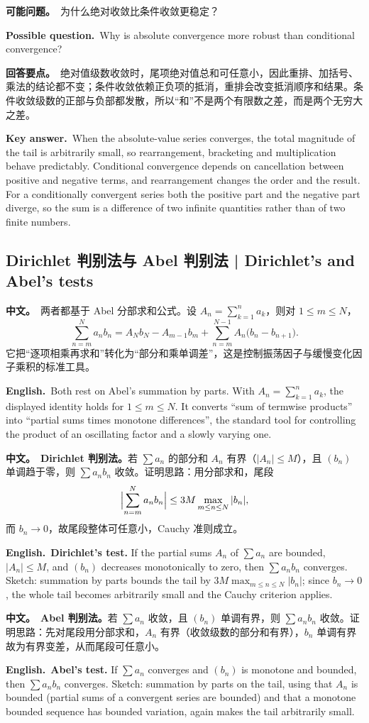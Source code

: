 \documentclass[UTF8,11pt,a4paper]{ctexart}
\newcommand{\BOTH}[2]{\par\noindent\textbf{中文。}\ #1\par\noindent\textbf{English.}\ #2\par}
\newcommand{\ASK}[4]{\begin{samepage}\par\noindent\textbf{可能问题。}\ #1\par\noindent\textbf{Possible question.}\ #2\par\noindent\textbf{回答要点。}\ #3\par\noindent\textbf{Key answer.}\ #4\medskip\end{samepage}}
\begin{document}
\ASK{为什么绝对收敛比条件收敛更稳定？}{Why is absolute convergence more robust than conditional convergence?}{绝对值级数收敛时，尾项绝对值总和可任意小，因此重排、加括号、乘法的结论都不变；条件收敛依赖正负项的抵消，重排会改变抵消顺序和结果。条件收敛级数的正部与负部都发散，所以“和”不是两个有限数之差，而是两个无穷大之差。}{When the absolute-value series converges, the total magnitude of the tail is arbitrarily small, so rearrangement, bracketing and multiplication behave predictably. Conditional convergence depends on cancellation between positive and negative terms, and rearrangement changes the order and the result. For a conditionally convergent series both the positive part and the negative part diverge, so the sum is a difference of two infinite quantities rather than of two finite numbers.}

\subsection{Dirichlet 判别法与 Abel 判别法 | Dirichlet's and Abel's tests}
\BOTH{两者都基于 Abel 分部求和公式。设 $A_n=\sum_{k=1}^{n}a_k$，则对 $1\le m\le N$，
\[
\sum_{n=m}^{N}a_nb_n=A_Nb_N-A_{m-1}b_m+\sum_{n=m}^{N-1}A_n\bigl(b_n-b_{n+1}\bigr).
\]
它把“逐项相乘再求和”转化为“部分和乘单调差”，这是控制振荡因子与缓慢变化因子乘积的标准工具。}{Both rest on Abel's summation by parts. With $A_n=\sum_{k=1}^{n}a_k$, the displayed identity holds for $1\le m\le N$. It converts “sum of termwise products” into “partial sums times monotone differences”, the standard tool for controlling the product of an oscillating factor and a slowly varying one.}
\BOTH{\textbf{Dirichlet 判别法。}若 $\sum a_n$ 的部分和 $A_n$ 有界（$|A_n|\le M$），且 $(b_n)$ 单调趋于零，则 $\sum a_nb_n$ 收敛。证明思路：用分部求和，尾段
\[
\Bigl|\sum_{n=m}^{N}a_nb_n\Bigr|\le 3M\max_{m\le n\le N}|b_n|,
\]
而 $b_n\to0$，故尾段整体可任意小，Cauchy 准则成立。}{\textbf{Dirichlet's test.} If the partial sums $A_n$ of $\sum a_n$ are bounded, $|A_n|\le M$, and $(b_n)$ decreases monotonically to zero, then $\sum a_nb_n$ converges. Sketch: summation by parts bounds the tail by $3M\max_{m\le n\le N}|b_n|$; since $b_n\to0$, the whole tail becomes arbitrarily small and the Cauchy criterion applies.}
\BOTH{\textbf{Abel 判别法。}若 $\sum a_n$ 收敛，且 $(b_n)$ 单调有界，则 $\sum a_nb_n$ 收敛。证明思路：先对尾段用分部求和，$A_n$ 有界（收敛级数的部分和有界），$b_n$ 单调有界故为有界变差，从而尾段可任意小。}{\textbf{Abel's test.} If $\sum a_n$ converges and $(b_n)$ is monotone and bounded, then $\sum a_nb_n$ converges. Sketch: summation by parts on the tail, using that $A_n$ is bounded (partial sums of a convergent series are bounded) and that a monotone bounded sequence has bounded variation, again makes the tail arbitrarily small.}
\end{document}

